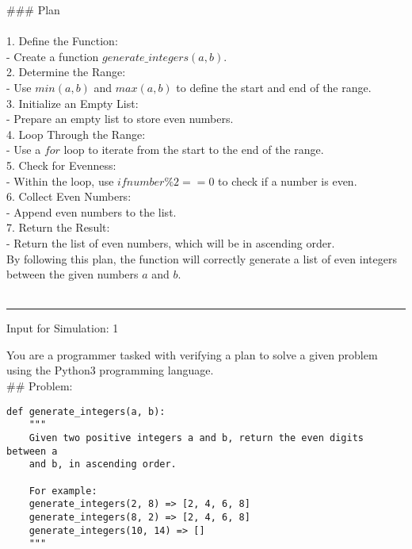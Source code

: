 \#\#\# Plan \\
 \\
1. \*\*Define the Function:\*\* \\
   - Create a function $generate\_integers(a, b)$. \\

2. \*\*Determine the Range:\*\* \\
   - Use $min(a, b)$ and $max(a, b)$ to define the start and end of the range. \\

3. \*\*Initialize an Empty List:\*\* \\
   - Prepare an empty list to store even numbers. \\

4. \*\*Loop Through the Range:\*\* \\
   - Use a $for$ loop to iterate from the start to the end of the range. \\

5. \*\*Check for Evenness:\*\* \\
   - Within the loop, use $if number \% 2 == 0$ to check if a number is even. \\

6. \*\*Collect Even Numbers:\*\* \\
   - Append even numbers to the list. \\

7. \*\*Return the Result:\*\* \\
   - Return the list of even numbers, which will be in ascending order. \\

By following this plan, the function will correctly generate a list of even integers between the given numbers $a$ and $b$. \\
 \\

\vspace{0.5cm} \hrule   \vspace{0.5cm}
Input for Simulation: 1


You are a programmer tasked with verifying a plan to solve a given problem using the \*\*Python3\*\* programming language. \\

\#\# Problem: \\
\begin{verbatim}
def generate_integers(a, b):
    """
    Given two positive integers a and b, return the even digits between a
    and b, in ascending order.

    For example:
    generate_integers(2, 8) => [2, 4, 6, 8]
    generate_integers(8, 2) => [2, 4, 6, 8]
    generate_integers(10, 14) => []
    """
\end{verbatim}

